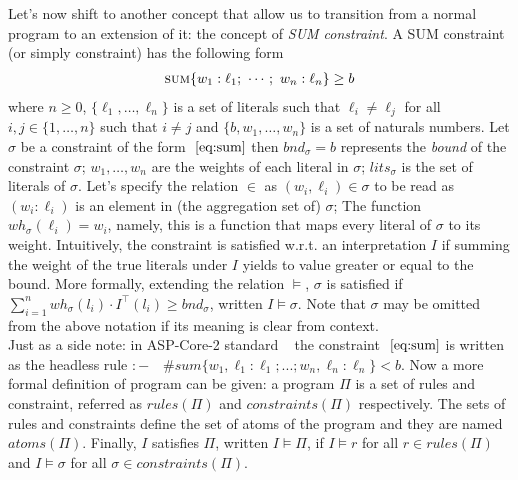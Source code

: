 Let's now shift to another concept that allow us to 
transition from a normal program to an extension of it: the concept of \textit{SUM constraint}.
A SUM constraint (or simply constraint) has the following form
\begin{align}\label{eq:sum}
    \textsc{sum}\{w_1 : \ell_1;\ \cdots;\ w_n : \ell_n\} \geq b
\end{align}
where $n \ge 0$, $\{\ell_1, \hdots, \ell_n\}$ is a set of literals such that 
$\ell_i \ne \ell_j$ for all $i,j \in \{1, \hdots, n\}$ such that $i \ne j$
and $\{b, w_1, \hdots, w_n \}$ is a set of naturals numbers.
Let $\sigma$  be a constraint of the form $~\ref{eq:sum}$ then $\mathit{bnd}_{\sigma} = b$
represents the \textit{bound} of the constraint $\sigma$; $w_1, \hdots, w_n$
are the weights of each literal in $\sigma$; $lits_{\sigma}$ is the set of literals of $\sigma$.
Let's specify the relation $\in$ as $(w_i, \ell_i) \in \sigma$ to be read  
as $(w_i : \ell_i)$ is an element in (the aggregation set of) $\sigma$;
The function $\mathit{wh_{\sigma}}(\ell_i) = w_i$, namely, this is a function that 
maps every literal of $\sigma$ to its weight.
Intuitively, the constraint is satisfied w.r.t. an interpretation $I$ 
if summing the weight of the true literals under $I$ yields to value greater or equal to the bound.
More formally, extending the relation $\models$, $\sigma$ is satisfied if 
$\sum_{i=1}^{n} \mathit{wh}_{\sigma}(l_i) \cdot I^{\top}(l_i) \ge \mathit{bnd}_{\sigma}$,
written $I \models \sigma$.
Note that $\sigma$ may be omitted from the above notation if its meaning is clear from context.\\
Just as a side note: in ASP-Core-2 standard
~\cite{DBLP:journals/tplp/CalimeriFGIKKLM20} 
the constraint  $~\ref{eq:sum}$ is written as the headless rule
$\mathit{:-} \quad \#sum\{w_1,\ell_1 : \ell_1; ...; w_n,\ell_n : \ell_n\} < b.$
Now a more formal definition of program can be given:
a program $\Pi$ is a set of rules and constraint, referred as $\mathit{rules}(\Pi)$ 
and $\mathit{constraints}(\Pi)$ respectively.
The sets of rules and constraints define the set of atoms of the program and they are named $\mathit{atoms}(\Pi)$.
Finally, $I$ satisfies $\Pi$, written $I \models \Pi$, if $I \models r$ for all $r \in \mathit{rules}(\Pi)$
and $I \models \sigma$ for all $\sigma \in \mathit{constraints}(\Pi)$.

